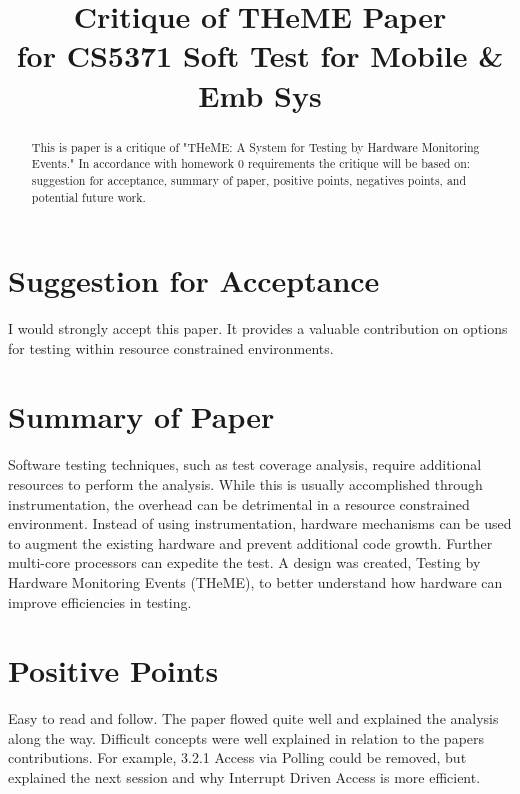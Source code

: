 \documentclass[conference]{IEEEtran}
\begin{document}
\title{Critique of THeME Paper \\
for CS5371 Soft Test for Mobile \& Emb Sys}

\author{
}

\maketitle

\begin{abstract}
This is paper is a critique of "THeME: A System for Testing by Hardware Monitoring Events." In accordance with homework 0 requirements the critique will be based on: suggestion for acceptance, summary of paper, positive points, negatives points, and potential future work. 
\end{abstract}

\IEEEpeerreviewmaketitle


\section{Suggestion for Acceptance}
I would strongly accept this paper. It provides a valuable contribution on options for testing within resource constrained environments.

\section{Summary of Paper}
Software testing techniques, such as test coverage analysis, require additional resources to perform the analysis. While this is usually accomplished through instrumentation, the overhead can be detrimental in a resource constrained environment. Instead of using instrumentation, hardware mechanisms can be used to augment the existing hardware and prevent additional code growth. Further multi-core processors can expedite the test. A design was created, Testing by Hardware Monitoring Events (THeME), to better understand how hardware can improve efficiencies in testing. 

\section{Positive Points}
Easy to read and follow. The paper flowed quite well and explained the analysis along the way. Difficult concepts were well explained in relation to the papers contributions. For example, 3.2.1 Access via Polling could be removed, but explained the next session and why Interrupt Driven Access is more efficient. 
\end{document}
